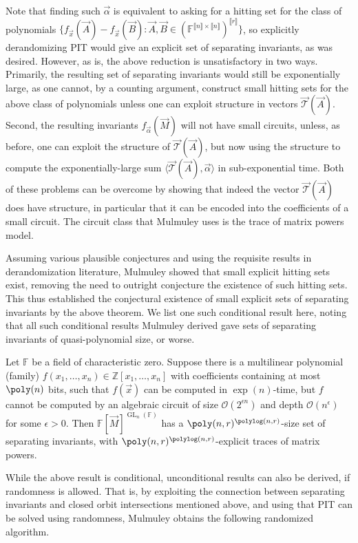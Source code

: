 \documentclass[letterpaper,11pt]{article}
\numberwithin{equation}{section}
\theoremstyle{plain}
\theoremstyle{remark}
\newcommand{\zr}[1]{{\llbracket {#1}\rrbracket}}
\newcommand{\la}{\langle}
\newcommand{\ra}{\rangle}
\DeclareMathOperator{\GL}{GL}
\newcommand{\F}{\mathbb{F}}
\newcommand{\Z}{\mathbb{Z}}
\newcommand{\cT}{\mathcal{T}}
\renewcommand{\O}{\mathcal{O}}
\begin{document}
Note that finding such $\vec{\alpha}$ is equivalent to asking for a hitting set for the class of polynomials $\{f_{\vec{x}}(\vec{A})-f_{\vec{x}}(\vec{B}):\vec{A},\vec{B}\in(\F^{\zr{n}\times\zr{n}})^{\zr{r}}\}$, so explicitly derandomizing PIT would give an explicit set of separating invariants, as was desired.  However, as is, the above reduction is unsatisfactory in two ways.  Primarily, the resulting set of separating invariants would still be exponentially large, as one cannot, by a counting argument, construct small hitting sets for the above class of polynomials unless one can exploit structure in vectors $\vec{\cT}(\vec{A})$.  Second, the resulting invariants $f_{\vec{\alpha}}(\vec{M})$ will not have small circuits, unless, as before, one can exploit the structure of $\vec{\cT}(\vec{A})$, but now using the structure to compute the exponentially-large sum $\la\vec{\cT}(\vec{A}),\vec{\alpha}\ra$ in sub-exponential time.  Both of these problems can be overcome by showing that indeed the vector $\vec{\cT}(\vec{A})$ does have structure, in particular that it can be encoded into the coefficients of a small circuit.  The circuit class that Mulmuley uses is the trace of matrix powers model.

Assuming various plausible conjectures and using the requisite results in derandomization literature, Mulmuley showed that small explicit hitting sets exist, removing the need to outright conjecture the existence of such hitting sets.  This thus established the conjectural existence of small explicit sets of separating invariants by the above theorem.  We list one such conditional result here, noting that all such conditional results Mulmuley derived gave sets of separating invariants of quasi-polynomial size, or worse.

\begin{theorem*}
	Let $\F$ be a field of characteristic zero. Suppose there is a multilinear polynomial (family) $f(x_1,\ldots,x_n)\in\Z[x_1,\ldots,x_n]$ with coefficients containing at most $\poly(n)$ bits, such that $f(\vec{x})$ can be computed in $\exp(n)$-time, but $f$ cannot be computed by an algebraic circuit of size $\O(2^{\epsilon n})$ and depth $\O(n^{\epsilon})$ for some $\epsilon>0$. Then  $\F[\vec{M}]^{\GL_n(\F)}$ has a $\poly(n,r)^{\polylog(n,r)}$-size set of separating invariants, with $\poly(n,r)^{\polylog(n,r)}$-explicit traces of matrix powers.
\end{theorem*}

While the above result is conditional, unconditional results can also be derived, if randomness is allowed.  That is, by exploiting the connection between separating invariants and closed orbit intersections mentioned above, and using that PIT can be solved using randomness, Mulmuley obtains the following randomized algorithm.
\end{document}
